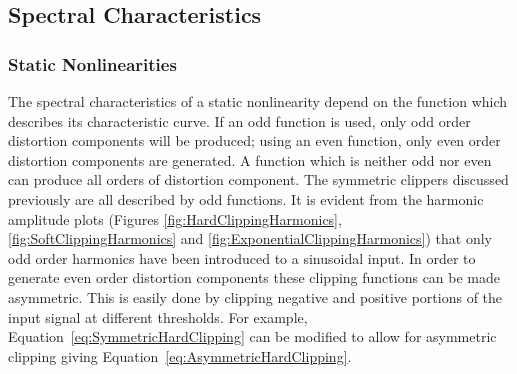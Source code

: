 %			
%
%			

	\subsection{Spectral Characteristics}
	\label{sec:ExcitationEvaluation-Comparison-SpectralCharacteristics}
		\subsubsection*{Static Nonlinearities}
			The spectral characteristics of a static nonlinearity depend on the function which describes its
			characteristic curve. If an odd function is used, only odd order distortion components will be
			produced; using an even function, only even order distortion components are generated. A function
			which is neither odd nor even can produce all orders of distortion component. The symmetric
			clippers discussed previously are all described by odd functions. It is evident from the harmonic
			amplitude plots (Figures \ref{fig:HardClippingHarmonics}, \ref{fig:SoftClippingHarmonics} and
			\ref{fig:ExponentialClippingHarmonics}) that only odd order harmonics have been introduced to a
			sinusoidal input. In order to generate even order distortion components these clipping functions
			can be made asymmetric. This is easily done by clipping negative and positive portions of the input
			signal at different thresholds. For example, Equation~\ref{eq:SymmetricHardClipping} can be
			modified to allow for asymmetric clipping giving Equation~\ref{eq:AsymmetricHardClipping}.
			
